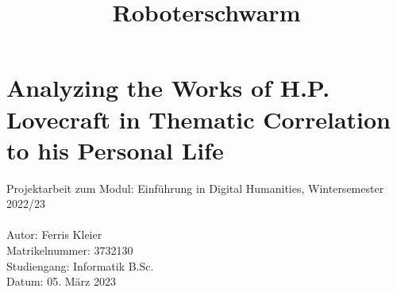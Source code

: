 \documentclass[11pt]{article}
\title{Roboterschwarm}
\begin{document}
     \section*{Analyzing the Works of H.P. Lovecraft in Thematic Correlation to his Personal Life}
    Projektarbeit zum Modul: Einführung in Digital Humanities, Wintersemester 2022/23\\\\
    Autor: Ferris Kleier\\
    Matrikelnummer: 3732130\\
    Studiengang: Informatik B.Sc.\\
    Datum: 05. März 2023

    
    
    
    
    
    
    
    
    
\end{document}
